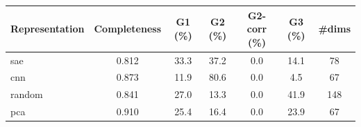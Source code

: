 \begin{tabular}{lcccccc}
\toprule
Representation & Completeness & G1 (\%) & G2 (\%) & G2-corr (\%) & G3 (\%) & \#dims \\
\midrule
sae & 0.812 & 33.3 & 37.2 & 0.0 & 14.1 & 78 \\
cnn & 0.873 & 11.9 & 80.6 & 0.0 & 4.5 & 67 \\
random & 0.841 & 27.0 & 13.3 & 0.0 & 41.9 & 148 \\
pca & 0.910 & 25.4 & 16.4 & 0.0 & 23.9 & 67 \\
\bottomrule
\end{tabular}